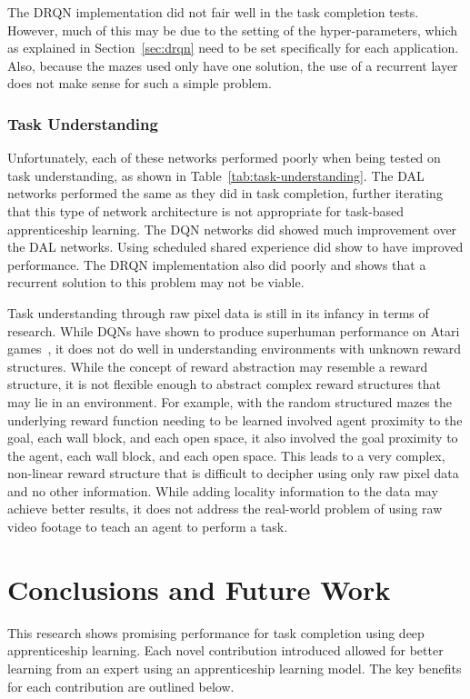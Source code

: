 \documentclass[12pt,american]{report}
\begin{document}
The DRQN implementation did not fair well in the task completion tests. However, much of this may be due to the setting of the hyper-parameters, which as explained in Section~\ref{sec:drqn} need to be set specifically for each application.  Also, because the mazes used only have one solution, the use of a recurrent layer does not make sense for such a simple problem.

\subsection{Task Understanding}
Unfortunately, each of these networks performed poorly when being tested on task understanding, as shown in Table~\ref{tab:task-understanding}.  The DAL networks performed the same as they did in task completion, further iterating that this type of network architecture is not appropriate for task-based apprenticeship learning. The DQN networks did showed much improvement over the DAL networks.  Using scheduled shared experience did show to have improved performance.  The DRQN implementation also did poorly and shows that a recurrent solution to this problem may not be viable. 

Task understanding through raw pixel data is still in its infancy in terms of research.  While DQNs have shown to produce superhuman performance on Atari games~\cite{atari}, it does not do well in understanding environments with unknown reward structures.  While the concept of reward abstraction may resemble a reward structure, it is not flexible enough to abstract complex reward structures that may lie in an environment.  For example, with the random structured mazes the underlying reward function needing to be learned involved agent proximity to the goal, each wall block, and each open space, it also involved the goal proximity to the agent, each wall block, and each open space.  This leads to a very complex, non-linear reward structure that is difficult to decipher using only raw pixel data and no other information.  While adding locality information to the data may achieve better results, it does not address the real-world problem of using raw video footage to teach an agent to perform a task. 


\chapter{Conclusions and Future Work}
\label{sec:conclusions}
This research shows promising performance for task completion using deep apprenticeship learning.  Each novel contribution introduced allowed for better learning from an expert using an apprenticeship learning model.  The key benefits for each contribution are outlined below. 
\end{document}
